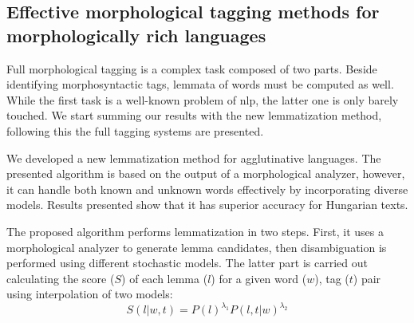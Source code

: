 \let\oldthesubsection=\thesubsection
\renewcommand{\thesubsection}{\Roman{subsection}}

%
%

\subsection{Effective morphological tagging methods for morphologically rich languages} %
\label{thes:morf}

Full morphological tagging is a complex task composed of two parts. 
Beside identifying morphosyntactic tags, lemmata of words must be computed as well.
While the first task is a well-known problem of \acrlong{nlp}, the latter one is only barely touched.
We start summing our results with the new lemmatization method, following this the full tagging systems are presented. 


\begin{core}
\begin{thesis}\label{thes:morf-lemma}
We developed a new lemmatization method for agglutinative languages.
The presented algorithm is based on the output of a morphological analyzer, however, it can handle both known and unknown words effectively by incorporating diverse models. 
Results presented show that it has superior accuracy for Hungarian texts.
\end{thesis} 

\begin{pub}
\cite{Orosz2011,Orosz2012,Orosz2012a,Orosz2013a}
\end{pub}
\end{core}

The proposed algorithm performs lemmatization in two steps. 
First, it uses a morphological analyzer to generate lemma candidates, then disambiguation is performed using different stochastic models.
The latter part is carried out calculating the score ($S$) of each lemma ($l$) for a given word ($w$), tag ($t$) pair using interpolation of two models:
\begin{equation} %
S(l|w,t) = P(l)^{\lambda_1} P(l,t|w)^{\lambda_2}
\end{equation}

